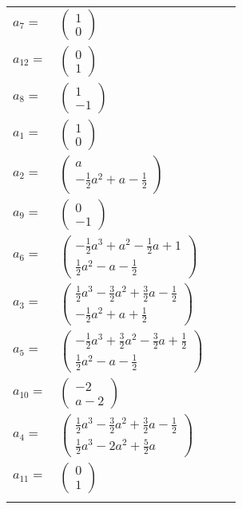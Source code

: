 \documentclass[1p]{elsarticle_modified}
\theoremstyle{definition}
\begin{document}
\begin{tabular}{m{7pt} m{180pt} m{7pt} m{180pt} }
\flushright $a_{7}=$&$\begin{pmatrix}1\\0\end{pmatrix}$ \\
\flushright $a_{12}=$&$\begin{pmatrix}0\\1\end{pmatrix}$ \\
\flushright $a_{8}=$&$\begin{pmatrix}1\\-1\end{pmatrix}$ \\
\flushright $a_{1}=$&$\begin{pmatrix}1\\0\end{pmatrix}$ \\
\flushright $a_{2}=$&$\begin{pmatrix}a\\-\frac{1}{2} a^2+a-\frac{1}{2}\end{pmatrix}$ \\
\flushright $a_{9}=$&$\begin{pmatrix}0\\-1\end{pmatrix}$ \\
\flushright $a_{6}=$&$\begin{pmatrix}-\frac{1}{2} a^3+a^2-\frac{1}{2} a+1\\\frac{1}{2} a^2- a-\frac{1}{2}\end{pmatrix}$ \\
\flushright $a_{3}=$&$\begin{pmatrix}\frac{1}{2} a^3-\frac{3}{2} a^2+\frac{3}{2} a-\frac{1}{2}\\-\frac{1}{2} a^2+a+\frac{1}{2}\end{pmatrix}$ \\
\flushright $a_{5}=$&$\begin{pmatrix}-\frac{1}{2} a^3+\frac{3}{2} a^2-\frac{3}{2} a+\frac{1}{2}\\\frac{1}{2} a^2- a-\frac{1}{2}\end{pmatrix}$ \\
\flushright $a_{10}=$&$\begin{pmatrix}-2\\a-2\end{pmatrix}$ \\
\flushright $a_{4}=$&$\begin{pmatrix}\frac{1}{2} a^3-\frac{3}{2} a^2+\frac{3}{2} a-\frac{1}{2}\\\frac{1}{2} a^3-2 a^2+\frac{5}{2} a\end{pmatrix}$ \\
\flushright $a_{11}=$&$\begin{pmatrix}0\\1\end{pmatrix}$\\&\end{tabular}
\end{document}
